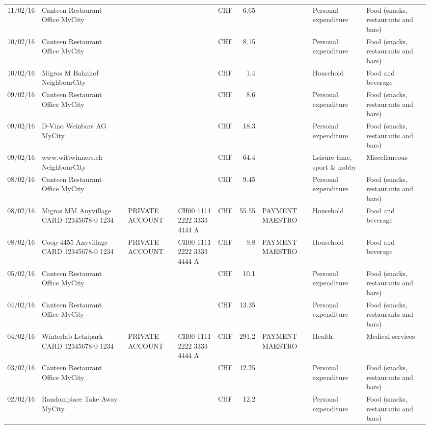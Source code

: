 \begin{landscape}
\begin{table}[h]
\begin{center}
\begin{tabular}{rllllrlll}
		11/02/16 & Canteen Restaurant Office      MyCity &       &       & CHF   & 6.65  &       & Personal expenditure & Food (snacks, restaurants and bars) \\
		10/02/16 & Canteen Restaurant Office      MyCity &       &       & CHF   & 8.15  &       & Personal expenditure & Food (snacks, restaurants and bars) \\
		10/02/16 & Migros M Bahnhof         NeighbourCity &       &       & CHF   & 1.4   &       & Household & Food and beverage \\
		09/02/16 & Canteen Restaurant Office      MyCity &       &       & CHF   & 8.6   &       & Personal expenditure & Food (snacks, restaurants and bars) \\
		09/02/16 & D-Vino Weinbars AG       MyCity &       &       & CHF   & 18.3  &       & Personal expenditure & Food (snacks, restaurants and bars) \\
		09/02/16 & www.wittwinners.ch        NeighbourCity &       &       & CHF   & 64.4  &       & Leisure time, sport \& hobby & Miscellaneous \\
		08/02/16 & Canteen Restaurant Office      MyCity &       &       & CHF   & 9.45  &       & Personal expenditure & Food (snacks, restaurants and bars) \\
		08/02/16 & Migros MM Anyvillage CARD 12345678-0 1234 & PRIVATE ACCOUNT & CH00 1111 2222 3333 4444 A & CHF   & 55.55 & PAYMENT MAESTRO & Household & Food and beverage \\
		08/02/16 & Coop-4455 Anyvillage CARD 12345678-0 1234 & PRIVATE ACCOUNT & CH00 1111 2222 3333 4444 A & CHF   & 9.8   & PAYMENT MAESTRO & Household & Food and beverage \\
		05/02/16 & Canteen Restaurant Office      MyCity &       &       & CHF   & 10.1  &       & Personal expenditure & Food (snacks, restaurants and bars) \\
		04/02/16 & Canteen Restaurant Office      MyCity &       &       & CHF   & 13.35 &       & Personal expenditure & Food (snacks, restaurants and bars) \\
		04/02/16 & Winterlab Letzipark CARD 12345678-0 1234 & PRIVATE ACCOUNT & CH00 1111 2222 3333 4444 A & CHF   & 291.2 & PAYMENT MAESTRO & Health & Medical services  \\
		03/02/16 & Canteen Restaurant Office      MyCity &       &       & CHF   & 12.25 &       & Personal expenditure & Food (snacks, restaurants and bars) \\
		02/02/16 & Randomplace Take Away     MyCity &       &       & CHF   & 12.2  &       & Personal expenditure & Food (snacks, restaurants and bars) \\

\end{tabular}
\end{center}
\end{table}
\end{landscape}
